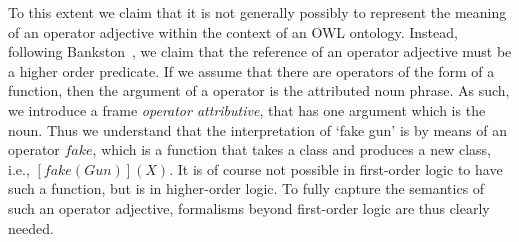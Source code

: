\documentclass[11pt]{article}
\begin{document}
To this extent we claim that it is not generally possibly to represent the 
meaning of an operator adjective within the context of an OWL ontology.
Instead, following Bankston~\cite{bankston2003modeling}, we claim that
the reference of an operator adjective must be a higher order predicate.
If we assume that there are operators of the form of a function, then
the argument of a operator is the attributed noun phrase. As such, we introduce a frame \emph{operator attributive}, that has one argument
which is the noun. Thus we understand that the interpretation of `fake gun' is
by means of an operator $fake$, which is a function that takes a class 
and produces a new class, i.e., $[fake(Gun)](X)$. It is of course not possible
in first-order logic to have such a function, but is in higher-order
logic.
%
%
%
To fully capture the semantics of such an operator adjective, formalisms beyond first-order logic are thus clearly needed.
\end{document}
